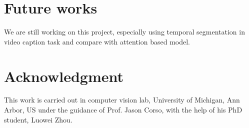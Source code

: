 \section{Future works}
We are still working on this project, especially using temporal segmentation in video caption task and compare with attention based model.

\section{Acknowledgment}
This work is carried out in computer vision lab, University of Michigan, Ann Arbor, US under the guidance of Prof. Jason Corso, with the help of his PhD  student, Luowei Zhou.




